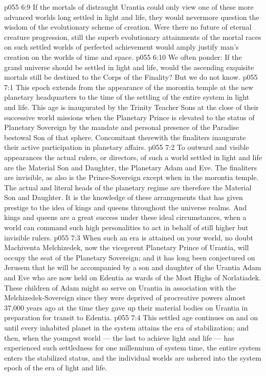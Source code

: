 \vs p055 6:9 If the mortals of distraught Urantia could only view one of these more advanced worlds long settled in light and life, they would nevermore question the wisdom of the evolutionary scheme of creation. Were there no future of eternal creature progression, still the superb evolutionary attainments of the mortal races on such settled worlds of perfected achievement would amply justify man’s creation on the worlds of time and space.
\vs p055 6:10 We often ponder: If the grand universe should be settled in light and life, would the ascending exquisite mortals still be destined to the Corps of the Finality? But we do not know.
\vs p055 7:1 This epoch extends from the appearance of the morontia temple at the new planetary headquarters to the time of the settling of the entire system in light and life. This age is inaugurated by the Trinity Teacher Sons at the close of their successive world missions when the Planetary Prince is elevated to the status of Planetary Sovereign by the mandate and personal presence of the Paradise bestowal Son of that sphere. Concomitant therewith the finaliters inaugurate their active participation in planetary affairs.
\vs p055 7:2 To outward and visible appearances the actual rulers, or directors, of such a world settled in light and life are the Material Son and Daughter, the Planetary Adam and Eve. The finaliters are invisible, as also is the Prince\hyp{}Sovereign except when in the morontia temple. The actual and literal heads of the planetary regime are therefore the Material Son and Daughter. It is the knowledge of these arrangements that has given prestige to the idea of kings and queens throughout the universe realms. And kings and queens are a great success under these ideal circumstances, when a world can command such high personalities to act in behalf of still higher but invisible rulers.
\vs p055 7:3 When such an era is attained on your world, no doubt Machiventa Melchizedek, now the vicegerent Planetary Prince of Urantia, will occupy the seat of the Planetary Sovereign; and it has long been conjectured on Jerusem that he will be accompanied by a son and daughter of the Urantia Adam and Eve who are now held on Edentia as wards of the Most Highs of Norlatiadek. These children of Adam might so serve on Urantia in association with the Melchizedek\hyp{}Sovereign since they were deprived of procreative powers almost 37,000 years ago at the time they gave up their material bodies on Urantia in preparation for transit to Edentia.
\vs p055 7:4 \pc This settled age continues on and on until every inhabited planet in the system attains the era of stabilization; and then, when the youngest world --- the last to achieve light and life --- has experienced such settledness for one millennium of system time, the entire system enters the stabilized status, and the individual worlds are ushered into the system epoch of the era of light and life.
